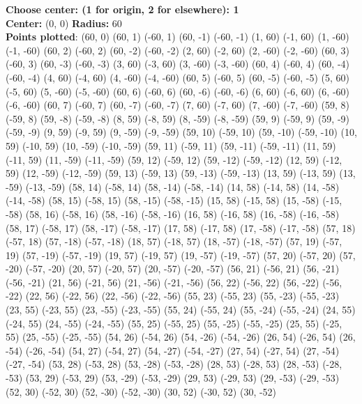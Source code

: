 \documentclass[12pt,letterpaper]{article}
\begin{document}
\textbf{Choose center: (1 for origin, 2 for elsewhere): 1}\\
\textbf{Center:} (0, 0)
\textbf{Radius:} 60\\

\textbf{Points plotted}: 
(60, 0) (60, 1) (-60, 1) (60, -1) 
(-60, -1) (1, 60) (-1, 60) (1, -60) 
(-1, -60) (60, 2) (-60, 2) (60, -2) 
(-60, -2) (2, 60) (-2, 60) (2, -60) 
(-2, -60) (60, 3) (-60, 3) (60, -3) 
(-60, -3) (3, 60) (-3, 60) (3, -60) 
(-3, -60) (60, 4) (-60, 4) (60, -4) 
(-60, -4) (4, 60) (-4, 60) (4, -60) 
(-4, -60) (60, 5) (-60, 5) (60, -5) 
(-60, -5) (5, 60) (-5, 60) (5, -60) 
(-5, -60) (60, 6) (-60, 6) (60, -6) 
(-60, -6) (6, 60) (-6, 60) (6, -60) 
(-6, -60) (60, 7) (-60, 7) (60, -7) 
(-60, -7) (7, 60) (-7, 60) (7, -60) 
(-7, -60) (59, 8) (-59, 8) (59, -8) 
(-59, -8) (8, 59) (-8, 59) (8, -59) 
(-8, -59) (59, 9) (-59, 9) (59, -9) 
(-59, -9) (9, 59) (-9, 59) (9, -59) 
(-9, -59) (59, 10) (-59, 10) (59, -10) 
(-59, -10) (10, 59) (-10, 59) (10, -59) 
(-10, -59) (59, 11) (-59, 11) (59, -11) 
(-59, -11) (11, 59) (-11, 59) (11, -59) 
(-11, -59) (59, 12) (-59, 12) (59, -12) 
(-59, -12) (12, 59) (-12, 59) (12, -59) 
(-12, -59) (59, 13) (-59, 13) (59, -13) 
(-59, -13) (13, 59) (-13, 59) (13, -59) 
(-13, -59) (58, 14) (-58, 14) (58, -14) 
(-58, -14) (14, 58) (-14, 58) (14, -58) 
(-14, -58) (58, 15) (-58, 15) (58, -15) 
(-58, -15) (15, 58) (-15, 58) (15, -58) 
(-15, -58) (58, 16) (-58, 16) (58, -16) 
(-58, -16) (16, 58) (-16, 58) (16, -58) 
(-16, -58) (58, 17) (-58, 17) (58, -17) 
(-58, -17) (17, 58) (-17, 58) (17, -58) 
(-17, -58) (57, 18) (-57, 18) (57, -18) 
(-57, -18) (18, 57) (-18, 57) (18, -57) 
(-18, -57) (57, 19) (-57, 19) (57, -19) 
(-57, -19) (19, 57) (-19, 57) (19, -57) 
(-19, -57) (57, 20) (-57, 20) (57, -20) 
(-57, -20) (20, 57) (-20, 57) (20, -57) 
(-20, -57) (56, 21) (-56, 21) (56, -21) 
(-56, -21) (21, 56) (-21, 56) (21, -56) 
(-21, -56) (56, 22) (-56, 22) (56, -22) 
(-56, -22) (22, 56) (-22, 56) (22, -56) 
(-22, -56) (55, 23) (-55, 23) (55, -23) 
(-55, -23) (23, 55) (-23, 55) (23, -55) 
(-23, -55) (55, 24) (-55, 24) (55, -24) 
(-55, -24) (24, 55) (-24, 55) (24, -55) 
(-24, -55) (55, 25) (-55, 25) (55, -25) 
(-55, -25) (25, 55) (-25, 55) (25, -55) 
(-25, -55) (54, 26) (-54, 26) (54, -26) 
(-54, -26) (26, 54) (-26, 54) (26, -54) 
(-26, -54) (54, 27) (-54, 27) (54, -27) 
(-54, -27) (27, 54) (-27, 54) (27, -54) 
(-27, -54) (53, 28) (-53, 28) (53, -28) 
(-53, -28) (28, 53) (-28, 53) (28, -53) 
(-28, -53) (53, 29) (-53, 29) (53, -29) 
(-53, -29) (29, 53) (-29, 53) (29, -53) 
(-29, -53) (52, 30) (-52, 30) (52, -30) 
(-52, -30) (30, 52) (-30, 52) (30, -52) 
\end{document}

